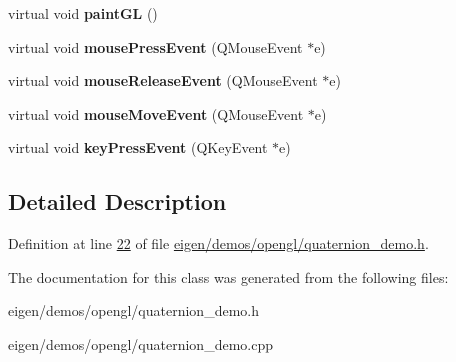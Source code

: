 \begin{DoxyCompactItemize}
virtual void {\bfseries paint\+GL} ()
\item 
\mbox{\label{class_rendering_widget_aa087e001fca2e2dffcfeeae747163619}} 
virtual void {\bfseries mouse\+Press\+Event} (Q\+Mouse\+Event $\ast$e)
\item 
\mbox{\label{class_rendering_widget_ac6e3a38324a47384e490fe0634907b2d}} 
virtual void {\bfseries mouse\+Release\+Event} (Q\+Mouse\+Event $\ast$e)
\item 
\mbox{\label{class_rendering_widget_a0adfc7eefad8605700ece1840d617758}} 
virtual void {\bfseries mouse\+Move\+Event} (Q\+Mouse\+Event $\ast$e)
\item 
\mbox{\label{class_rendering_widget_aafdefd1f86d902b19d4082b811e1f0b9}} 
virtual void {\bfseries key\+Press\+Event} (Q\+Key\+Event $\ast$e)
\end{DoxyCompactItemize}


\subsection{Detailed Description}


Definition at line \hyperlink{eigen_2demos_2opengl_2quaternion__demo_8h_source_l00022}{22} of file \hyperlink{eigen_2demos_2opengl_2quaternion__demo_8h_source}{eigen/demos/opengl/quaternion\+\_\+demo.\+h}.



The documentation for this class was generated from the following files\+:\begin{DoxyCompactItemize}
\item 
eigen/demos/opengl/quaternion\+\_\+demo.\+h\item 
eigen/demos/opengl/quaternion\+\_\+demo.\+cpp\end{DoxyCompactItemize}
